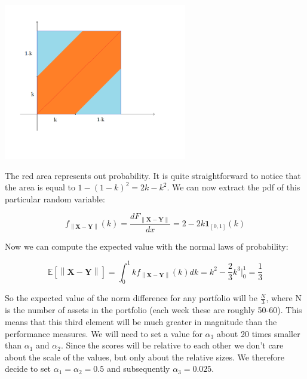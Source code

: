 \begin{center}
	\centering
	\includegraphics[width=0.6\textwidth]{Genetic_Algo/Prob_Square.png}
	\label{X_Y_plane}
\end{center}

The red area represents out probability. It is quite straightforward to notice that the area is equal to $1 - (1-k)^2 = 2k - k^2$. We can now extract the pdf of this particular random variable:

\begin{equation} \label{pdf}
f_{\left \lVert \mathbf{X} - \mathbf{Y}\right\rVert}(k) = \frac{dF_{\left \lVert \mathbf{X} - \mathbf{Y}\right\rVert}}{dx} = 2 - 2k \mathbf{1}_{[0,1]}(k)
\end{equation}

Now we can compute the expected value with the normal laws of probability:

\begin{equation} \label{expected_value}
\mathbb{E}\left[\left \lVert \mathbf{X} - \mathbf{Y}\right\rVert\right]  = \int_0^1 kf_{\left \lVert \mathbf{X} - \mathbf{Y}\right\rVert}(k)dk = k^2 - \frac{2}{3}k^3 \Big| _0^1 = \frac{1}{3}
\end{equation}

So the expected value of the norm difference for any portfolio will be $\frac{N}{3}$, where N is the number of assets in the portfolio (each week these are roughly 50-60). This means that this third element will be much greater in magnitude than the performance measures. We will need to set a value for $\alpha_3$ about 20 times smaller than $\alpha_1$ and $\alpha_2$. Since the scores will be relative to each other we don't care about the scale of the values, but only about the relative sizes. We therefore decide to set $\alpha_1 = \alpha_2 = 0.5$ and subsequently $\alpha_3 = 0.025$. 


